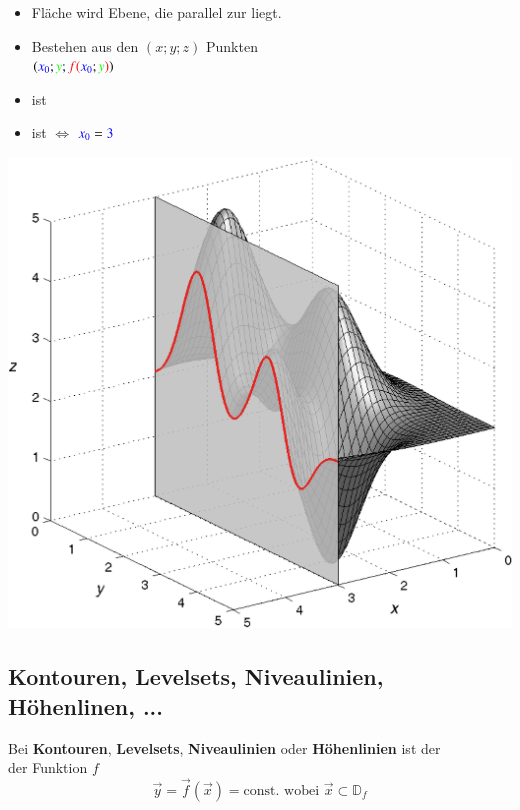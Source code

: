 \hfill
\begin{minipage}[t]{0.48\columnwidth}
    \textbf{}
    \begin{itemize}
        \item Fläche wird  Ebene, die parallel zur  liegt.
        \item Bestehen aus den $(x;y;z)$ Punkten\\
        $({\color{blue}x_0};{\color{green}y};{\color{red}f(}{\color{blue}x_0};{\color{green}y}{\color{red})})$
        \item {} ist 
        \item {} ist  $\Leftrightarrow$ ${{\color{blue}x_0} = {\color{blue}3}}$
    \end{itemize}
    \includegraphics[width=\columnwidth]{images/schnitt_x0.png}
\end{minipage}

\subsection{Kontouren, Levelsets, Niveaulinien, Höhenlinen, ...}
Bei \textbf{Kontouren}, \textbf{Levelsets}, \textbf{Niveaulinien} oder \textbf{Höhenlinien} ist der  \\
der Funktion ${f}$ \\
$$\vec{y} = \vec{f}(\vec{x}) = \text{const. wobei } \vec{x} \subset \mathbb{D}_f$$

